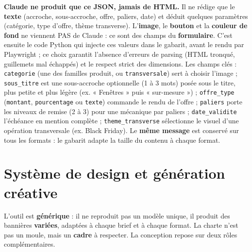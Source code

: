 \documentclass[11pt,a4paper]{article}
\begin{document}
\textbf{Claude ne produit que ce JSON, jamais de HTML.} Il ne rédige que le
\textbf{texte} (accroche, sous-accroche, offre, paliers, date) et déduit quelques paramètres
(catégorie, type d'offre, thème transverse). L'\textbf{image}, le \textbf{bouton}
et la \textbf{couleur de fond} ne viennent PAS de Claude : ce sont des champs du
\textbf{formulaire}. C'est ensuite le code Python qui injecte ces valeurs dans le
gabarit, avant le rendu par Playwright ; ce choix garantit l'absence d'erreurs de
parsing (HTML tronqué, guillemets mal échappés) et le respect strict des
dimensions. Les champs clés : \texttt{categorie} (une des familles produit, ou
\texttt{transversale}) sert à choisir l'image ; \texttt{sous\_titre} est une
sous-accroche optionnelle (1 à 3 mots) posée sous le titre, plus petite et plus légère
(ex. « Fenêtres » puis « sur-mesure ») ; \texttt{offre\_type}
(\texttt{montant}, \texttt{pourcentage} ou \texttt{texte}) commande le rendu de
l'offre ; \texttt{paliers} porte les niveaux de remise (2 à 3) pour une mécanique
par paliers ; \texttt{date\_validite} l'échéance en mention complète ;
\texttt{theme\_transverse} sélectionne le visuel d'une opération transversale (ex.
Black Friday). Le \textbf{même message} est conservé sur tous les formats : le
gabarit adapte la taille du contenu à chaque format.

\section{Système de design et génération créative}
L'outil est \textbf{générique} : il ne reproduit pas un modèle unique, il produit
des bannières \textbf{variées}, adaptées à chaque brief et à chaque format. La
charte n'est pas un moule, mais un \textbf{cadre} à respecter. La conception repose
sur deux rôles complémentaires.
\end{document}
